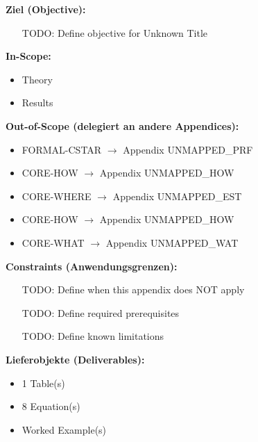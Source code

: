 

\begin{tcolorbox}[
    colback=orange!5!white,
    colframe=orange!75!black,
    title={\textbf{Appendix Scope: Ziel / In-Scope / Out-of-Scope / Constraints}},
    fonttitle=\bfseries
]

\textbf{Ziel (Objective):}
\begin{itemize}[nosep]
    \item [TODO: Define objective for Unknown Title]
\end{itemize}

\textbf{In-Scope:}
\begin{itemize}[nosep]
    \item Theory
    \item Results
\end{itemize}

\textbf{Out-of-Scope (delegiert an andere Appendices):}
\begin{itemize}[nosep]
    \item FORMAL-CSTAR $\rightarrow$ Appendix UNMAPPED_PRF
    \item CORE-HOW $\rightarrow$ Appendix UNMAPPED_HOW
    \item CORE-WHERE $\rightarrow$ Appendix UNMAPPED_EST
    \item CORE-HOW $\rightarrow$ Appendix UNMAPPED_HOW
    \item CORE-WHAT $\rightarrow$ Appendix UNMAPPED_WAT
\end{itemize}

\textbf{Constraints (Anwendungsgrenzen):}
\begin{itemize}[nosep]
    \item [TODO: Define when this appendix does NOT apply]
    \item [TODO: Define required prerequisites]
    \item [TODO: Define known limitations]
\end{itemize}

\textbf{Lieferobjekte (Deliverables):}
\begin{itemize}[nosep]
    \item 1 Table(s)
    \item 8 Equation(s)
    \item Worked Example(s)
\end{itemize}

\end{tcolorbox}


